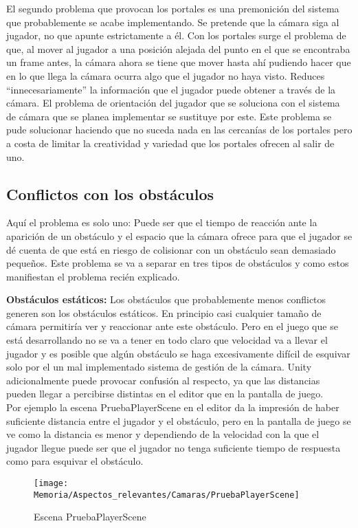 El segundo problema que provocan los portales es una premonición del sistema que probablemente se acabe implementando. Se pretende que la cámara siga al jugador, no que apunte estrictamente a él. Con los portales surge el problema de que, al mover al jugador a una posición alejada del punto en el que se encontraba un frame antes, la cámara ahora se tiene que mover hasta ahí pudiendo hacer que en lo que llega la cámara ocurra algo que el jugador no haya visto. Reduces “innecesariamente” la información que el jugador puede obtener a través de la cámara. El problema de orientación del jugador que se soluciona con el sistema de cámara que se planea implementar se sustituye por este. Este problema se pude solucionar haciendo que no suceda nada en las cercanías de los portales pero a costa de limitar la creatividad y variedad que los portales ofrecen al salir de uno.

\subsection{Conflictos con los obstáculos}
Aquí el problema es solo uno: Puede ser que el tiempo de reacción ante la aparición de un obstáculo y el espacio que la cámara ofrece para que el jugador se dé cuenta de que está en riesgo de colisionar con un obstáculo sean demasiado pequeños. Este problema se va a separar en tres tipos de obstáculos y como estos manifiestan el problema recién explicado.

\textbf{Obstáculos estáticos:} Los obstáculos que probablemente menos conflictos generen son los obstáculos estáticos. En principio casi cualquier tamaño de cámara permitiría ver y reaccionar ante este obstáculo. Pero en el juego que se está desarrollando no se va a tener en todo claro que velocidad va a llevar el jugador y es posible que algún obstáculo se haga excesivamente difícil de esquivar solo por el un mal implementado sistema de gestión de la cámara. Unity adicionalmente puede provocar confusión al respecto, ya que las distancias pueden llegar a percibirse distintas en el editor que en la pantalla de juego.\\
Por ejemplo la escena PruebaPlayerScene en el editor da la impresión de haber suficiente distancia entre el jugador y el obstáculo, pero en la pantalla de juego se ve como la distancia es menor y dependiendo de la velocidad con la que el jugador llegue puede ser que el jugador no tenga suficiente tiempo de respuesta como para esquivar el obstáculo.

\begin{figure}[h]
\texttt{[image: Memoria/Aspectos\_relevantes/Camaras/PruebaPlayerScene]}
\caption{Escena PruebaPlayerScene}
\end{figure}

